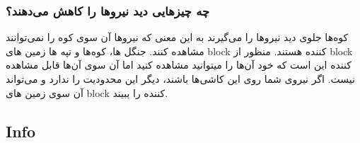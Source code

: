 \documentclass[]{article}
\begin{document}
\subsubsection*{{\titr چه چیزهایی دید نیرو‌ها را کاهش می‌دهند؟}}
کوه‌ها جلوی دید نیرو‌ها را می‌گیرند به این معنی که نیروها آن سوی کوه را نمی‌توانند مشاهده کنند.
جنگل ها، کوه‌ها و تپه ها زمین های block کننده هستند. منظور از block کننده این است که خود آن‌ها را میتوانید مشاهده کنید اما آن سوی آن‌ها قابل مشاهده نیست. اگر نیروی شما روی این کاشی‌ها باشند، دیگر این محدودیت را ندارد و می‌تواند آن سوی زمین های block کننده را ببیند.

\newpage
\subsection*{{\titr Info}} %
\end{document}

